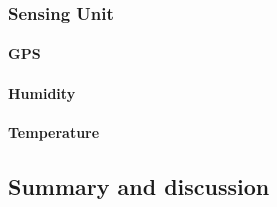 \begin{table}[h!]
\begin{tabulary}{\columnwidth}{L|L|L|C|C|C|C|C}
	\end{tabulary}
\caption{\label{tab:sx1276} }
\end{table}

\subsubsection{Sensing Unit}

\paragraph{GPS}

\paragraph{Humidity}

\paragraph{Temperature}


\subsection{Summary and discussion}

















